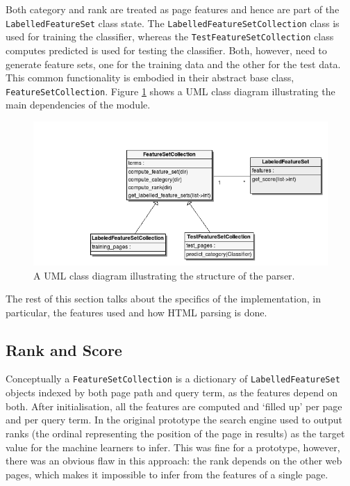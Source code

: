 \documentclass[12pt,notitlepage,twoside]{scrbook}
\begin{document}
Both category and rank are treated as page features and hence are part of the
\texttt{LabelledFeatureSet} class state.  The
\texttt{LabelledFeatureSetCollection} class is used for training the classifier,
whereas the \texttt{TestFeatureSetCollection} class computes predicted is used
for testing the classifier. Both, however, need to generate
feature sets, one for the training data and the other for the test data. This
common functionality is embodied in their abstract base class,
\texttt{FeatureSetCollection}. Figure \ref{uml} shows a UML class diagram
illustrating the main dependencies of the module.

\begin{figure}[h!]
\centering
\includegraphics[scale=0.5]{figs/uml.png}
\caption{A UML class diagram illustrating the structure of the parser.}
\label{uml}
\end{figure}

The rest of this section talks about the specifics of the implementation, in
particular, the features used and how HTML parsing is done.

\subsection{Rank and Score}
Conceptually a \texttt{FeatureSetCollection} is a dictionary of \texttt{LabelledFeatureSet}
objects indexed by both page path and query term, as the features depend on both. After initialisation, all
the features are computed and `filled up' per page and per query term.
In the original prototype the search engine used to output ranks (the ordinal representing the position of the
page in results) as the target value for the machine learners to infer. This was fine for
a prototype, however, there was an obvious flaw in this approach: the rank depends
on the other web pages, which makes it impossible to infer from the features of a single
page. 
\end{document}
